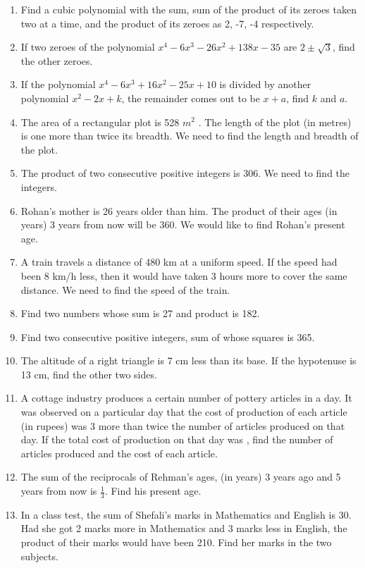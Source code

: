 \begin{enumerate}[label=\arabic*.,ref=\thesubsection.\theenumi]
\begin{enumerate}
\end{enumerate}
\item Find a cubic polynomial with the sum, sum of the product of its zeroes taken two at a time, and the product of its zeroes as 2, -7, -4 respectively.
\item If two zeroes of the polynomial $x^4-6x^3-26x^2+138x-35$ are $2\pm \sqrt{3}$, find the other zeroes.\item If the polynomial $x^4-6x^3+16x^2-25x+10$ is divided by another polynomial $x^2-2x+k$, the remainder comes out to be $x+a$, find $k$ and $a$.
\item The area of a rectangular plot is 528 $m^2$
. The length of the plot (in metres) is one more than twice its breadth. We need to find the length and breadth of the plot.
\item The product of two consecutive positive integers is 306. We need to find the integers.
\item Rohan’s mother is 26 years older than him. The product of their ages (in years) 3 years from now will be 360. We would like to find Rohan’s present age.
\item A train travels a distance of 480 km at a uniform speed. If the speed had been 8 km/h less, then it would have taken 3 hours more to cover the same distance. We need to find the speed of the train.
\item Find two numbers whose sum is 27 and product is 182. 
\item  Find two consecutive positive integers, sum of whose squares is 365. 
\item  The altitude of a right triangle is 7 cm less than its base. If the hypotenuse is 13 cm, find the other two sides.
\item  A cottage industry produces a certain number of pottery articles in a day. It was observed on a particular day that the cost of production of each article (in rupees) was 3 more than twice the number of articles produced on that day. If the total cost of production on that day was , find the number of articles produced and the cost of each article.\item The sum of the reciprocals of Rehman’s ages, (in years) 3 years ago and 5 years from now is $\frac{1}{3}$.  Find his present age.
\item In a class test, the sum of Shefali’s marks in Mathematics and English is 30. Had she got 2 marks more in Mathematics and 3 marks less in English, the product of their marks would have been 210. Find her marks in the two subjects.

\end{enumerate}
